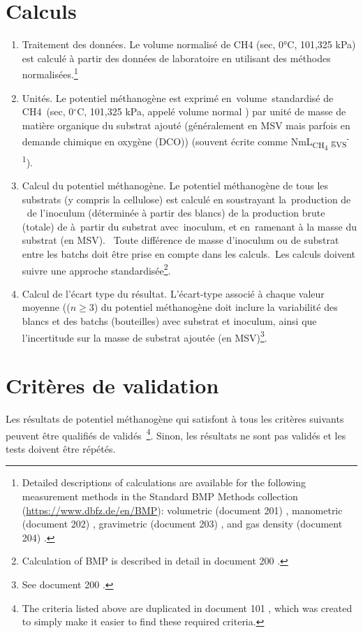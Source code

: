 \documentclass[]{article}
\begin{document}
\section{Calculs}
\label{sec:calculations}
\begin{enumerate}
  \item Traitement des données. 
    Le volume normalisé de CH4 (sec, 0°C, 101,325 kPa) est calculé à partir des données de laboratoire en utilisant des méthodes normalisées.\footnote{
      Detailed descriptions of calculations are available for the following measurement methods in the Standard BMP Methods collection (\url{https://www.dbfz.de/en/BMP}): volumetric (document 201) \citep{BMPdoc201vol}, manometric (document 202) \citep{BMPdoc202man}, gravimetric (document 203) \citep{BMPdoc203grav}, and gas density (document 204) \citep{BMPdoc204gasdens}.
    }
  \item Unités. 
    Le potentiel méthanogène est exprimé en volume standardisé de CH4 (sec, 0$^\circ$C, 101,325 kPa, appelé volume \guillemotleft normal \guillemotright) par unité de masse de matière organique du substrat ajouté (généralement en MSV mais parfois en demande chimique en oxygène (DCO)) (souvent écrite comme NmL\textsubscript{CH\textsubscript{4}} g\textsubscript{VS}\textsuperscript{-1}). 
  \item Calcul du potentiel méthanogène.
    Le potentiel méthanogène de tous les substrats (y compris la cellulose) est calculé en soustrayant la production de  de l’inoculum (déterminée à partir des blancs) de la production brute (totale) de  à partir du substrat avec inoculum, et en ramenant à la masse du substrat (en MSV). 
    Toute différence de masse d'inoculum ou de substrat entre les batchs doit être prise en compte dans les calculs. Les calculs doivent suivre une approche standardisée\footnote{
      Calculation of BMP is described in detail in document 200 \citep{BMPdoc200BMP}.
    }.
  \item Calcul de l’écart type du résultat. 
    L'écart-type associé à chaque valeur moyenne (($n \ge 3$) du potentiel méthanogène doit inclure la variabilité des blancs et des batchs (bouteilles) avec substrat et inoculum, ainsi que l'incertitude sur la masse de substrat ajoutée (en MSV)\footnote{
      See document 200 \citep{BMPdoc200BMP}. 
    }.
\end{enumerate}

\section{Critères de validation}
\label{sec:crit}
Les résultats de potentiel méthanogène qui satisfont à tous les critères suivants peuvent être qualifiés de \guillemotleft validés \guillemotright \footnote{
The criteria listed above are duplicated in document 101 \citep{BMPdoc101val}, which was created to simply make it easier to find these required criteria.
}.
Sinon, les résultats ne sont pas validés et les tests doivent être répétés.
\end{document}
